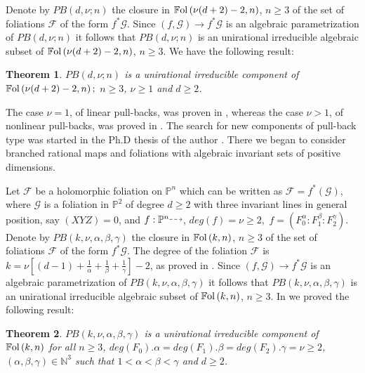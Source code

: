 \documentclass{amsart}
\newtheorem{theorem}{Theorem}[section]
\theoremstyle{definition}
\theoremstyle{proposition}
\numberwithin{equation}{section}
\theoremstyle{main}
\begin{document}
Denote by $PB(d,\nu;n)$ the closure in $\mathbb{F}{\rm{ol}}\left(\nu(d+2)-2,n\right)$, $n \geq 3$ of the set of foliations $\mathcal F$ of the form $f^{\ast}\mathcal G$. Since $(f,\mathcal G)\to f^{\ast}\mathcal G$ is an algebraic parametrization of $PB(d,\nu;n)$ it follows that $PB(d,\nu;n)$ is an unirational irreducible algebraic subset of $\mathbb{F}{\rm{ol}}\left(\nu(d+2)-2,n\right)$, $n \geq 3$. We have the following result:
\begin{theorem}
  $PB(d,\nu;n)$ is a unirational irreducible component of\break $\mathbb{F}{\rm{ol}}\left(\nu(d+2)-2,n\right);$ $n \geq 3$, $\nu\geq1$  and $d \geq 2$.
\end{theorem}
The case $\nu=1$, of linear pull-backs, was proven in \cite{caln}, whereas the case $\nu>1$, of nonlinear pull-backs, was proved in \cite{clne}. The search for new components of pull-back type was started in the Ph.D thesis of the author \cite{cs}. There we began to consider branched rational maps and foliations with algebraic invariant sets of positive dimensions.  

Let $\mathcal{F}$ be a holomorphic foliation on $\mathbb P^n$ which can be written as $\mathcal {F}= f^{*}\left(\mathcal{G}\right)$, where $\mathcal{G}$ is a  foliation in $ {\mathbb P^2}$ of degree $d\geq2$ with three invariant lines in general position, say $(XYZ)=0$, and $f:{\mathbb P^n}{\mathbin{\tikz [baseline=-0.25ex,-latex, dashed,->,densely dashed] \draw [->,densely dashed] (0pt,
0.5ex) -- (1.3em,0.5ex);}}$, $deg\left(f\right)=\nu\geq2,$  $f=\left(F^\alpha_{0}:F^\beta_{1}:F^\gamma_{2}\right)$.
Denote by $PB(k,\nu,\alpha,\beta,\gamma)$ the closure in  $\mathbb{F}{\rm{ol}}\left(k,n\right)$, $n \geq 3$ of the set of foliations $\mathcal F$ of the form $f^{\ast}\mathcal G$. The degree of the foliation $\mathcal F$ is  ${k=\nu\left[\left(d-1\right)+\frac{1}{\alpha}+\frac{1}{\beta}+\frac{1}{\gamma}\right] - 2}$, as proved in \cite{cs}. Since $(f,\mathcal G)\to f^{\ast}\mathcal G$ is an algebraic parametrization of \break$PB(k,\nu,\alpha,\beta,\gamma)$ it follows that $PB(k,\nu,\alpha,\beta,\gamma)$ is an unirational irreducible algebraic subset of $\mathbb{F}{\rm{ol}}\left(k,n\right)$, $n \geq 3$. In \cite{cs} we proved the following result:
\begin{theorem}
 $PB(k,\nu,\alpha,\beta,\gamma)$ is a unirational irreducible component of \space$\mathbb{F}{\rm{ol}}\left(k,n\right)$ for all $n \geq 3$, $deg(F_{0}).\alpha = deg(F_{1}).\beta = deg(F_{2}).\gamma=\nu\geq2$, $(\alpha, \beta,\gamma) \in \mathbb N^{3}$ such that $1< \alpha < \beta < \gamma$ and $d \geq 2$. 
\end{theorem}
\end{document}
